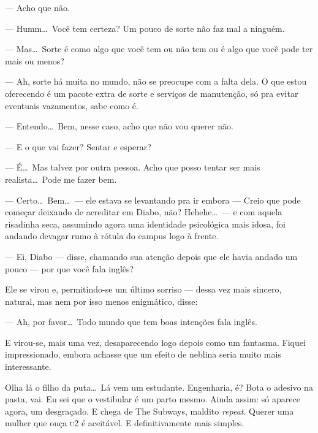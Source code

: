 --- Acho que não.

--- Humm\ldots \ Você tem certeza? Um pouco de sorte não faz mal a ninguém.

--- Mas\ldots \ Sorte é como algo que você tem ou não tem ou é algo que você pode ter mais ou menos?

--- Ah, sorte há muita no mundo, não se preocupe com a falta dela. O que estou oferecendo é um pacote extra de sorte e serviços de manutenção, só pra evitar eventuais vazamentos, sabe como é.

--- Entendo\ldots \ Bem, nesse caso, acho que não vou querer não.

--- E o que vai fazer? Sentar e esperar?

--- É\ldots \ Mas talvez por outra pessoa. Acho que posso tentar ser mais realista\ldots \ Pode me fazer bem.

--- Certo\ldots \ Bem\ldots \ --- ele estava se levantando pra ir embora --- Creio que pode começar deixando de acreditar em Diabo, não? Hehehe\ldots \ --- e com aquela risadinha seca, assumindo agora uma identidade psicológica mais idosa, foi andando devagar rumo à rótula do campus logo à frente.

--- Ei, Diabo --- disse, chamando sua atenção depois que ele havia andado um pouco --- por que você fala inglês?

Ele se virou e, permitindo-se um último sorriso --- dessa vez mais sincero, natural, mas nem por isso menos enigmático, disse:

--- Ah, por favor\ldots \ Todo mundo que tem boas intenções fala inglês.

E virou-se, mais uma vez, desaparecendo logo depois como um fantasma. Fiquei impressionado, embora achasse que um efeito de neblina seria muito mais interessante.

Olha lá o filho da puta\ldots \ Lá vem um estudante. Engenharia, é? Bota o adesivo na pasta, vai. Eu sei que o vestibular é um parto mesmo. Ainda assim: só aparece agora, um desgraçado. E chega de The Subways, maldito \emph{repeat}. Querer uma mulher que ouça \textsc{u}2 é aceitável. E definitivamente mais simples.
